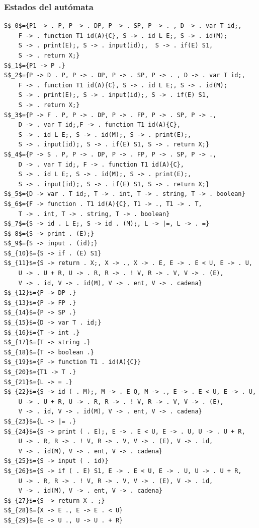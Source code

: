 \documentclass[a4paper, 12pt]{article}
\begin{document}
\subsubsection{Estados del autómata}
\lstset{
  basicstyle=\mdseries,
  xleftmargin=0em,
  mathescape=true
}

\begin{lstlisting}
S$_0$={P1 -> . P, P -> . DP, P -> . SP, P -> . , D -> . var T id;,
	F -> . function T1 id(A){C}, S -> . id L E;, S -> . id(M);
	S -> . print(E);, S -> . input(id);,  S -> . if(E) S1, 
	S -> . return X;}
S$_1$={P1 -> P .}
S$_2$={P -> D . P, P -> . DP, P -> . SP, P -> . , D -> . var T id;,
	F -> . function T1 id(A){C}, S -> . id L E;, S -> . id(M);
	S -> . print(E);, S -> . input(id);, S -> . if(E) S1, 
	S -> . return X;}
S$_3$={P -> F . P, P -> . DP, P -> . FP, P -> . SP, P -> .,
	D -> . var T id;,F -> . function T1 id(A){C}, 
	S -> . id L E;, S -> . id(M);, S -> . print(E);, 
	S -> . input(id);, S -> . if(E) S1, S -> . return X;}
S$_4$={P -> S . P, P -> . DP, P -> . FP, P -> . SP, P -> ., 
	D -> . var T id;, F -> . function T1 id(A){C}, 
	S -> . id L E;, S -> . id(M);, S -> . print(E);, 
	S -> . input(id);, S -> . if(E) S1, S -> . return X;}
S$_5$={D -> var . T id;, T -> . int, T -> . string, T -> . boolean}
S$_6$={F -> function . T1 id(A){C}, T1 -> ., T1 -> . T, 
	T -> . int, T -> . string, T -> . boolean}
S$_7$={S -> id . L E;, S -> id . (M);, L -> |=, L -> . =}
S$_8$={S -> print . (E);}
S$_9$={S -> input . (id);}
S$_{10}$={S -> if . (E) S1}
S$_{11}$={S -> return . X;, X -> ., X -> . E, E -> . E < U, E -> . U,
	U -> . U + R, U -> . R, R -> . ! V, R -> . V, V -> . (E),
	V -> . id, V -> . id(M), V -> . ent, V -> . cadena}
S$_{12}$={P -> DP .}
S$_{13}$={P -> FP .}
S$_{14}$={P -> SP .}
S$_{15}$={D -> var T . id;}
S$_{16}$={T -> int .}
S$_{17}$={T -> string .}
S$_{18}$={T -> boolean .}
S$_{19}$={F -> function T1 . id(A){C}}
S$_{20}$={T1 -> T .}
S$_{21}$={L -> = .}
S$_{22}$={S -> id ( . M);, M -> . E Q, M -> ., E -> . E < U, E -> . U,
	U -> . U + R, U -> . R, R -> . ! V, R -> . V, V -> . (E),
	V -> . id, V -> . id(M), V -> . ent, V -> . cadena}
S$_{23}$={L -> |= .}
S$_{24}$={S -> print ( . E);, E -> . E < U, E -> . U, U -> . U + R,
	U -> . R, R -> . ! V, R -> . V, V -> . (E), V -> . id,
	V -> . id(M), V -> . ent, V -> . cadena}
S$_{25}$={S -> input ( . id)}
S$_{26}$={S -> if ( . E) S1, E -> . E < U, E -> . U, U -> . U + R,
	U -> . R, R -> . ! V, R -> . V, V -> . (E), V -> . id,
	V -> . id(M), V -> . ent, V -> . cadena}
S$_{27}$={S -> return X . ;}
S$_{28}$={X -> E ., E -> E . < U}
S$_{29}$={E -> U ., U -> U . + R}

\end{lstlisting}
\end{document}
